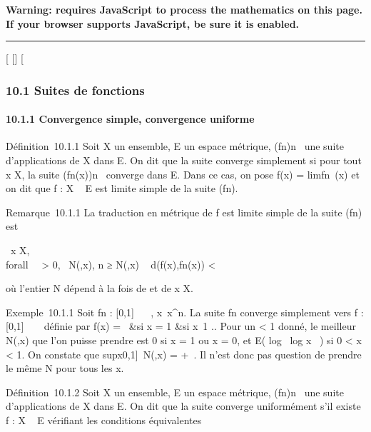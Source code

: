 \textbf{Warning: 
requires JavaScript to process the mathematics on this page.\\ If your
browser supports JavaScript, be sure it is enabled.}

\begin{center}\rule{3in}{0.4pt}\end{center}

{[}
{[}{]}
{[}

\subsubsection{10.1 Suites de fonctions}

\paragraph{10.1.1 Convergence simple, convergence uniforme}

Définition~10.1.1 Soit X un ensemble, E un espace métrique,
(fn)n\in{}~ une suite d'applications de X dans E. On dit
que la suite converge simplement si pour tout x \in X, la suite
(fn(x))n\in{}~ converge dans E. Dans ce cas, on pose
f(x) = limfn~(x) et on dit que f : X
\rightarrow~ E est limite simple de la suite (fn).

Remarque~10.1.1 La traduction en métrique de f est limite simple de la
suite (fn) est

\forall~x \in X, \\forall~~\epsilon
\textgreater{} 0, \exists~N(\epsilon,x),\quad
n ≥ N(\epsilon,x) \rigtharrow~ d(f(x),fn(x)) \textless{} \epsilon

où l'entier N dépend à la fois de \epsilon et de x \in X.

Exemple~10.1.1 Soit fn : {[}0,1{]} \rightarrow~ ~,
x\mapsto~x^n. La suite fn
converge simplement vers f : {[}0,1{]} \rightarrow~ ~ définie par f(x) =
\left \ &si x
= 1 &si x\neq~1 
\right .. Pour un \epsilon \textless{} 1 donné, le meilleur
N(\epsilon,x) que l'on puisse prendre est 0 si x = 1 ou x = 0, et E(
log~ \epsilon \over
log x~ ) si 0 \textless{} x \textless{} 1. On
constate que supx\in{[}0,1{]}~N(\epsilon,x) =
+\infty~. Il n'est donc pas question de prendre le même N pour tous les x.

Définition~10.1.2 Soit X un ensemble, E un espace métrique,
(fn)n\in{}~ une suite d'applications de X dans E. On dit
que la suite converge uniformément s'il existe f : X \rightarrow~ E vérifiant les
conditions équivalentes

